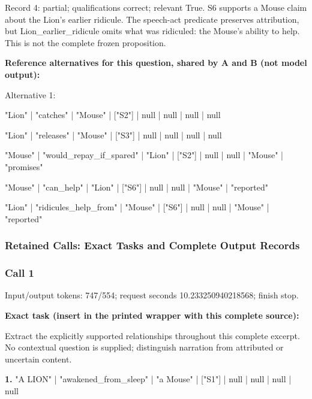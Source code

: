 \noindent Record 4: partial; qualifications correct; relevant True. S6 supports a Mouse claim about the Lion's earlier ridicule. The speech-act predicate preserves attribution, but Lion\_earlier\_ridicule omits what was ridiculed: the Mouse's ability to help. This is not the complete frozen proposition.\par\smallskip

\noindent\textbf{Reference alternatives for this question, shared by A and B (not model output):}

\noindent Alternative 1:

"Lion" | "catches" | "Mouse" | ["S2"] | null | null | null | null\par\smallskip

"Lion" | "releases" | "Mouse" | ["S3"] | null | null | null | null\par\smallskip

"Mouse" | "would\_repay\_if\_spared" | "Lion" | ["S2"] | null | null | "Mouse" | "promises"\par\smallskip

"Mouse" | "can\_help" | "Lion" | ["S6"] | null | null | "Mouse" | "reported"\par\smallskip

"Lion" | "ridicules\_help\_from" | "Mouse" | ["S6"] | null | null | "Mouse" | "reported"\par\smallskip

\subsubsection*{Retained Calls: Exact Tasks and Complete Output Records}

\subsubsection*{Call 1}

Input/output tokens: 747/554; request seconds 10.233250940218568; finish stop.

\noindent\textbf{Exact task (insert in the printed wrapper with this complete source):}\par Extract the explicitly supported relationships throughout this complete excerpt. No contextual question is supplied; distinguish narration from attributed or uncertain content.

\noindent\textbf{1.} "A LION" | "awakened\_from\_sleep" | "a Mouse" | ["S1"] | null | null | null | null\par\smallskip

